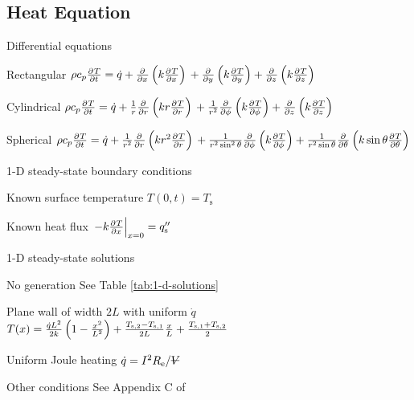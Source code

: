 \documentclass{article}
\begin{document}
\begin{multicols}{2}
\section{Heat Equation}
\begin{description*}
\item[Differential equations]~
  \begin{description*}
  \item[Rectangular]
    \(\rho c_p \pd{T}{t}
    = \dot q
    + \pd{}{x}\left(k\pd{T}{x}\right) \\
    + \pd{}{y}\left(k\pd{T}{y}\right)
    + \pd{}{z}\left(k\pd{T}{z}\right)\)
  \item[Cylindrical]
    \(\rho c_p \pd{T}{t}
    = \dot q
    + \frac{1}{r}\pd{}{r}\left(kr\pd{T}{r}\right) \\
    + \frac{1}{r^2}\pd{}{\phi}\left(k\pd{T}{\phi}\right)
    + \pd{}{z}\left(k\pd{T}{z}\right)\)
  \item[Spherical]
    \(\rho c_p \pd{T}{t}
    = \dot q
    + \frac{1}{r^2}\pd{}{r}\left(kr^2\pd{T}{r}\right) \\
    + \frac{1}{r^2\sin^2\theta}\pd{}{\phi}\left(k\pd{T}{\phi}\right)
    + \frac{1}{r^2\sin\theta}\pd{}{\theta}\left(k\sin\theta\pd{T}{\theta}\right)\)
  \end{description*}
\item[1-D steady-state boundary conditions]~
  \begin{description*}
  \item[Known surface temperature]
    \(T(0,t) = T_\mathrm{s}\)
  \item[Known heat flux]
    \(\left.-k\pd{T}{x}\right|_{x=0} = q''_\mathrm{s}\)
  \end{description*}
\item[1-D steady-state solutions]~
  \begin{description*}
  \item[No generation] See Table \ref{tab:1-d-solutions}
  \item[Plane wall of width $2L$ with uniform $\dot q$]
    \(T(x) \\
    = \frac{\dot{q}L^2}{2k}\left(1-\frac{x^2}{L^2}\right)
    + \frac{T_\mathrm{s,2}-T_\mathrm{s,1}}{2L}\frac{x}{L}
    + \frac{T_\mathrm{s,1}+T_\mathrm{s,2}}{2}\)
  \item[Uniform Joule heating]
    \(\dot q = I^2R_\mathrm{e}/\volsym\)
  \item[Other conditions] See Appendix C of \cite{hamt}
  \end{description*}
\end{description*}


\end{multicols}
\end{document}
